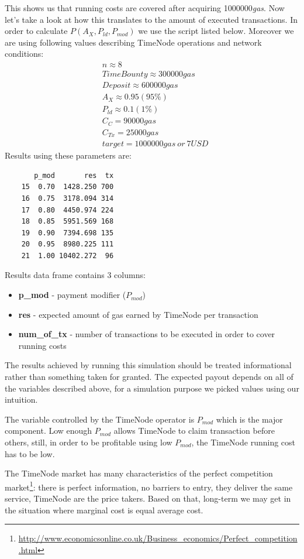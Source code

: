 \documentclass{report}
\begin{document}
\begin{appendices}
  This shows us that running costs are covered after acquiring 1000000\textit{gas}. Now let's take a look at how this translates to the amount of executed transactions. In order to calculate $P(A_{X}, P_{ld}, P_{mod})$ we use the script listed below. Moreover we are using following values describing TimeNode operations and network conditions:
  \begin{align*}
  &n \approx 8\\
  &TimeBounty \approx 300000gas\\
  &Deposit \approx 600000gas\\
  &A_{X} \approx 0.95 (95\%)\\
  &P_{ld} \approx 0.1 (1\%)\\
  &C_{C} = 90000gas\\
  &C_{Tx} = 25000gas\\
  &target = 1000000gas~or~7USD
  \end{align*}
  Results using these parameters are:
  \begin{verbatim}
       p_mod       res  tx
    15  0.70  1428.250 700
    16  0.75  3178.094 314
    17  0.80  4450.974 224
    18  0.85  5951.569 168
    19  0.90  7394.698 135
    20  0.95  8980.225 111
    21  1.00 10402.272  96
  \end{verbatim}
  Results data frame contains 3 columns:
  \begin{itemize}
  \item \textbf{p\_mod} - payment modifier ($P_{mod}$)
  \item \textbf{res} - expected amount of gas earned by TimeNode per transaction
  \item \textbf{num\_of\_tx} - number of transactions to be executed in order to cover running costs
  \end{itemize}

  The results achieved by running this simulation should be treated informational rather than something taken for granted. The expected payout depends on all of the variables described above, for a simulation purpose we picked values using our intuition.

  The variable controlled by the TimeNode operator is $P_{mod}$ which is the major component. Low enough $P_{mod}$ allows TimeNode to claim transaction before others, still, in order to be profitable using low $P_{mod} $, the TimeNode running cost has to be low.

  The TimeNode market has many characteristics of the perfect competition market\footnote{\url{http://www.economicsonline.co.uk/Business_economics/Perfect_competition.html}}: there is perfect information, no barriers to entry, they deliver the same service, TimeNode are the price takers. Based on that, long-term we may get in the situation where marginal cost is equal average cost.
  \end{appendices}
  
\end{document}
